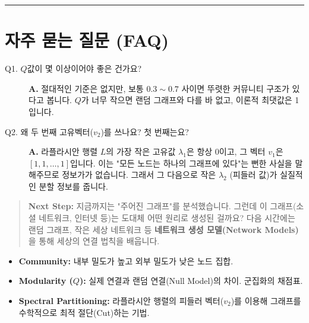 \documentclass[11pt,a4paper]{book}
\theoremstyle{definition}
\begin{document}
\vspace{0.5cm}\hrule\vspace{0.5cm}

\section{자주 묻는 질문 (FAQ)}

\begin{description}
    \item[Q1. $Q$값이 몇 이상이어야 좋은 건가요?]
    \textbf{A.} 절대적인 기준은 없지만, 보통 $0.3 \sim 0.7$ 사이면 뚜렷한 커뮤니티 구조가 있다고 봅니다. $Q$가 너무 작으면 랜덤 그래프와 다를 바 없고, 이론적 최댓값은 1입니다.
    
    \item[Q2. 왜 두 번째 고유벡터($v_2$)를 쓰나요? 첫 번째는요?]
    \textbf{A.} 라플라시안 행렬 $L$의 가장 작은 고유값 $\lambda_1$은 항상 0이고, 그 벡터 $v_1$은 $[1, 1, \dots, 1]$입니다. 이는 "모든 노드는 하나의 그래프에 있다"는 뻔한 사실을 말해주므로 정보가가 없습니다. 그래서 그 다음으로 작은 $\lambda_2$ (피들러 값)가 실질적인 분할 정보를 줍니다.
\end{description}

\vspace{1cm}
\begin{quote}
\textbf{Next Step:} 지금까지는 "주어진 그래프"를 분석했습니다. 그런데 이 그래프(소셜 네트워크, 인터넷 등)는 도대체 어떤 원리로 생성된 걸까요? 다음 시간에는 랜덤 그래프, 작은 세상 네트워크 등 \textbf{네트워크 생성 모델(Network Models)}을 통해 세상의 연결 법칙을 배웁니다.
\end{quote}

\begin{summarybox}[title={Module 2 (Part B) 핵심 요약}]
\begin{itemize}
    \item \textbf{Community:} 내부 밀도가 높고 외부 밀도가 낮은 노드 집합.
    \item \textbf{Modularity ($Q$):} 실제 연결과 랜덤 연결(Null Model)의 차이. 군집화의 채점표.
    \item \textbf{Spectral Partitioning:} 라플라시안 행렬의 피들러 벡터($v_2$)를 이용해 그래프를 수학적으로 최적 절단(Cut)하는 기법.
\end{itemize}
\end{summarybox}


\end{document}
